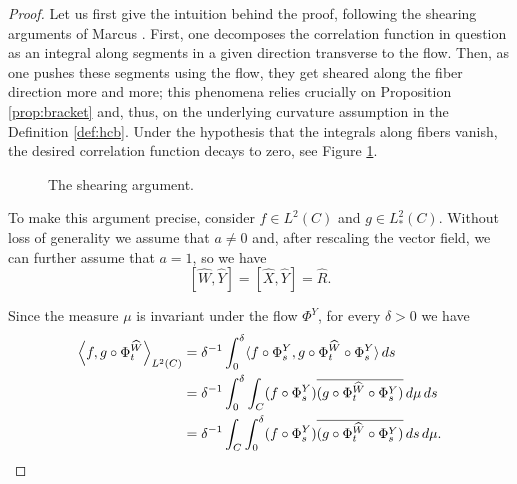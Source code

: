 \documentclass{amsart}
\theoremstyle{definition}
\theoremstyle{remark}
\numberwithin{equation}{section}
\newcommand{\wW}{\widehat{W}}
\newcommand{\<}{{\langle}}
\renewcommand{\>}{{\rangle}}
\newcommand{\jayadev}[1]{{\color{purple} \sf  J: [#1]}}
\begin{document}
\begin{proof}
Let us first give the intuition behind the proof, following the shearing arguments of Marcus \cite{Marcus}. First, one decomposes the correlation function in question as an integral along segments in a given direction transverse to the flow. Then, as one pushes these segments using the flow, they get sheared along the fiber direction more and more; this phenomena relies crucially on Proposition \ref{prop:bracket} and, thus, on the underlying curvature assumption in the Definition \ref{def:hcb}. Under the hypothesis that the integrals along fibers vanish, the desired correlation function decays to zero, see Figure \ref{fig:shear}.

\begin{figure}[ht]
\centering
\caption{The shearing argument.}
\label{fig:shear}
\end{figure}

To make this argument precise, consider $f \in L^2(C)$ and $g \in L^2_*(C)$. Without loss of generality we assume that $a \neq 0$ and, after rescaling the vector field, we can further assume that $a =1$, so we have
\begin{equation}
\label{eq:bracket}
\left[\widehat{W}, \widehat{Y}\right] = \left[\widehat{X}, \widehat{Y}\right] = \widehat{R}.
\end{equation}

Since the measure $\mu$ is invariant under the flow $\Phi^Y$, for every $\delta >0$ we have
\begin{align*}
\left\langle f, g \circ \Phi^{\wW}_t \right\rangle_{L^2(C)} &= \delta^{-1} 
\int_0^\delta \langle f\circ \Phi^Y_s , g \circ \Phi^{\wW}_t \circ \Phi^Y_s\rangle \thinspace ds\\ 
&=\delta^{-1} \int_0^\delta \int_{C} (f\circ \Phi^Y_s) \overline{(g \circ \Phi^{\wW}_t \circ \Phi^Y_s)} \thinspace d\mu \thinspace ds \\
&= \delta^{-1}  \int_{C} \int_0^\delta (f\circ \Phi^Y_s) \overline{(g \circ \Phi^{\wW}_t \circ \Phi^Y_s)} \thinspace ds \thinspace d\mu.
\end{align*}


\end{proof}
\end{document}
